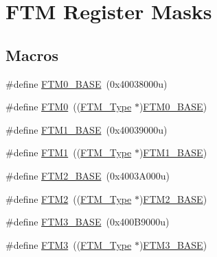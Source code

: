 \hypertarget{group___f_t_m___register___masks}{}\section{F\+TM Register Masks}
\label{group___f_t_m___register___masks}
\subsection*{Macros}
\begin{DoxyCompactItemize}
\item 
\#define \mbox{\hyperlink{group___f_t_m___register___masks_ga2ababc70fbf6b51c721d870fa1c66e45}{F\+T\+M0\+\_\+\+B\+A\+SE}}~(0x40038000u)
\item 
\#define \mbox{\hyperlink{group___f_t_m___register___masks_gac20d96b96f80ded87aa187f7519699ee}{F\+T\+M0}}~((\mbox{\hyperlink{struct_f_t_m___type}{F\+T\+M\+\_\+\+Type}} $\ast$)\mbox{\hyperlink{group___f_t_m___register___masks_ga2ababc70fbf6b51c721d870fa1c66e45}{F\+T\+M0\+\_\+\+B\+A\+SE}})
\item 
\#define \mbox{\hyperlink{group___f_t_m___register___masks_ga15ff8bad7e6945154dcffe5dc7404fd1}{F\+T\+M1\+\_\+\+B\+A\+SE}}~(0x40039000u)
\item 
\#define \mbox{\hyperlink{group___f_t_m___register___masks_ga48157ff57e27603582bc154901d44301}{F\+T\+M1}}~((\mbox{\hyperlink{struct_f_t_m___type}{F\+T\+M\+\_\+\+Type}} $\ast$)\mbox{\hyperlink{group___f_t_m___register___masks_ga15ff8bad7e6945154dcffe5dc7404fd1}{F\+T\+M1\+\_\+\+B\+A\+SE}})
\item 
\#define \mbox{\hyperlink{group___f_t_m___register___masks_ga5f4976435e0a348f88929eaf23157bad}{F\+T\+M2\+\_\+\+B\+A\+SE}}~(0x4003\+A000u)
\item 
\#define \mbox{\hyperlink{group___f_t_m___register___masks_gad4b8561c440952d2f7b095e4a7399a18}{F\+T\+M2}}~((\mbox{\hyperlink{struct_f_t_m___type}{F\+T\+M\+\_\+\+Type}} $\ast$)\mbox{\hyperlink{group___f_t_m___register___masks_ga5f4976435e0a348f88929eaf23157bad}{F\+T\+M2\+\_\+\+B\+A\+SE}})
\item 
\#define \mbox{\hyperlink{group___f_t_m___register___masks_gad7c56aa0db6bb5d095ce67d04031c615}{F\+T\+M3\+\_\+\+B\+A\+SE}}~(0x400\+B9000u)
\item 
\#define \mbox{\hyperlink{group___f_t_m___register___masks_ga60c8197c39b5da920e82cf4a4c8b2f49}{F\+T\+M3}}~((\mbox{\hyperlink{struct_f_t_m___type}{F\+T\+M\+\_\+\+Type}} $\ast$)\mbox{\hyperlink{group___f_t_m___register___masks_gad7c56aa0db6bb5d095ce67d04031c615}{F\+T\+M3\+\_\+\+B\+A\+SE}})

\end{DoxyCompactItemize}
